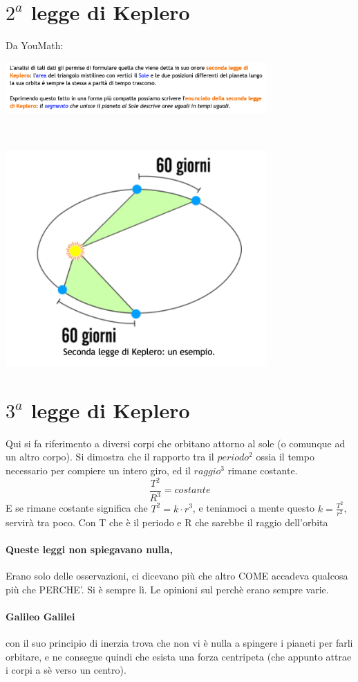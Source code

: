\documentclass[12pt, a4paper, openany, oneside]{book}
\begin{document}
\section{$2^{a}$ legge di Keplero} 
Da YouMath:
\begin{center}
\includegraphics[width=0.75\textwidth]{ym}
\end{center}
~
\begin{center}
\includegraphics[width=0.75\textwidth]{2kep}
\end{center}
\section{$3^{a}$ legge di Keplero}
Qui si fa riferimento a diversi corpi che orbitano attorno al sole (o comunque
ad un altro corpo). Si dimostra che il rapporto tra il $periodo^{2}$ ossia il
tempo necessario per compiere un intero giro, ed il $raggio^{3}$ rimane costante.
\[ 
\frac{T^{2}}{R^{3}} = costante
\]
E se rimane costante significa che $T^{2} = k\cdot r^{3}$, e teniamoci a mente
questo $k = \frac{T^{2}}{r^{2}}$, servirà tra poco.
Con T che è il periodo e R che sarebbe il raggio dell'orbita
\paragraph{Queste leggi non spiegavano nulla, } Erano solo delle osservazioni, 
ci dicevano più che altro COME accadeva qualcosa più che PERCHE'. Si è sempre
lì. Le opinioni sul perchè erano sempre varie.
\paragraph{Galileo Galilei }con il suo principio di inerzia trova che non vi è
nulla a spingere i pianeti per farli orbitare, e ne consegue quindi che esista
una forza centripeta (che appunto attrae i corpi a sè verso un centro).
\end{document}
